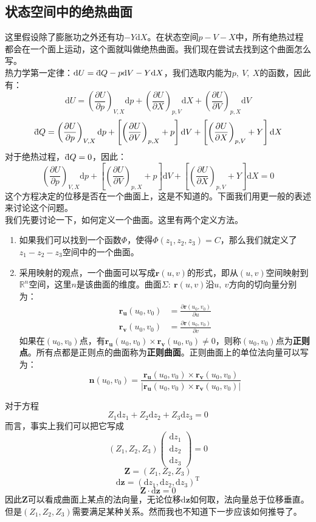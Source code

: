 \documentclass[UTF8]{ctexart}
\newcommand{\dbar}{\mathrm{\mathchar'26\mkern-9mu d}}
\newcommand{\md}{\mathrm{d}}
\numberwithin{equation}{subsection}
\begin{document}
\subsection{状态空间中的绝热曲面}
这里假设除了膨胀功之外还有功$-Y\md X$。在状态空间$p-V-X$中，所有绝热过程都会在一个面上运动，这个面就叫做绝热曲面。我们现在尝试去找到这个曲面怎么写。\\

热力学第一定律：$\md U=\dbar Q-p\md V-Y\md X$，我们选取内能为$p,\ V,\ X$的函数，因此有：
\[ \md U=\left(\dfrac{\partial U}{\partial p}\right)_{V,X}\md p+\left(\dfrac{\partial U}{\partial X}\right)_{p,V}\md X+\left(\dfrac{\partial U}{\partial V}\right)_{p,X}\md V \]
\[ \dbar Q=\left(\dfrac{\partial U}{\partial p}\right)_{V,X}\md p+\left[\left(\dfrac{\partial U}{\partial V}\right)_{p,X}+p\right]\md V+\left[\left(\dfrac{\partial U}{\partial X}\right)_{p,V}+Y\right]\md X \]
对于绝热过程，$\dbar Q=0$，因此：
\begin{equation*}
\left(\dfrac{\partial U}{\partial p}\right)_{V,X}\md p+\left[\left(\dfrac{\partial U}{\partial V}\right)_{p,X}+p\right]\md V+\left[\left(\dfrac{\partial U}{\partial X}\right)_{p,V}+Y\right]\md X=0
\end{equation*}
这个方程决定的位移是否在一个曲面上，这是不知道的。下面我们用更一般的表述来讨论这个问题。\\

我们先要讨论一下，如何定义一个曲面。这里有两个定义方法。
\begin{enumerate}
	\item 如果我们可以找到一个函数$\Phi$，使得$\Phi(z_1,z_2,z_3)=C$，那么我们就定义了$z_1-z_2-z_3$空间中的一个曲面。
	\item
	采用映射的观点，一个曲面可以写成$\bm{r}(u,v)$的形式，即从$(u,v)$空间映射到$\mathbb{R}^n$空间，这里$n$是该曲面的维度。曲面$\Sigma:\ \bm{r}(u,v)$沿$u,\ v$方向的切向量分别为：
	\begin{align*}
	\bm{r_u}(u_0,v_0)&=\frac{\partial \bm{r}(u_0,v_0)}{\partial u}\\
	\bm{r_v}(u_0,v_0)&=\frac{\partial \bm{r}(u_0,v_0)}{\partial v}
	\end{align*}
	如果在$(u_0,v_0)$点，有$\bm{r_u}(u_0,v_0)\times\bm{r_v}(u_0,v_0)\neq 0$，则称$(u_0,v_0)$点为\textbf{正则点}。所有点都是正则点的曲面称为\textbf{正则曲面}。正则曲面上的单位法向量可以写为：
	\[ \bm{n}(u_0,v_0)=\frac{\bm{r_u}(u_0,v_0)\times\bm{r_v}(u_0,v_0)}{|\bm{r_u}(u_0,v_0)\times\bm{r_v}(u_0,v_0)|} \]
\end{enumerate}
对于方程
\[ Z_1\md z_1+Z_2\md z_2+Z_3\md z_3=0 \]
而言，事实上我们可以把它写成
\[ (Z_1,Z_2,Z_3)\begin{pmatrix}
\md z_1\\ 
\md z_2\\ 
\md z_3
\end{pmatrix}=0  \]
\[ \bm{Z}=(Z_1,Z_2,Z_3) \]
\[ \md\bm{z}=(\md z_1,\md z_2,\md z_3)^{\text{T}} \]
\[ \bm{Z}\cdot\md\bm{z}=0 \]
因此$\bm{Z}$可以看成曲面上某点的法向量，无论位移$\md\bm{z}$如何取，法向量总于位移垂直。但是$(Z_1,Z_2,Z_3)$需要满足某种关系。然而我也不知道下一步应该如何推导了。\\
\end{document}
